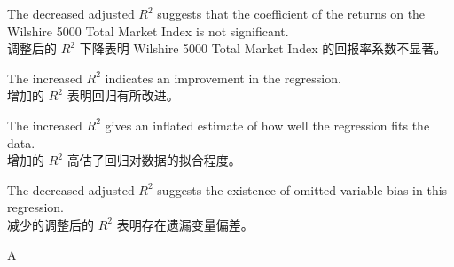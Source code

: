 \documentclass{article}
\begin{document}
    \begin{choices}
        \item The decreased adjusted \(R^{2}\) suggests that the coefficient of the returns on the Wilshire 5000 Total Market Index is not significant.\\
        调整后的 \(R^{2}\) 下降表明 Wilshire 5000 Total Market Index 的回报率系数不显著。
        \item The increased \(R^{2}\) indicates an improvement in the regression.\\
        增加的 \(R^{2}\) 表明回归有所改进。
        \item The increased \(R^{2}\) gives an inflated estimate of how well the regression fits the data.\\
        增加的 \(R^{2}\) 高估了回归对数据的拟合程度。
        \item The decreased adjusted \(R^{2}\) suggests the existence of omitted variable bias in this regression.\\
        减少的调整后的 \(R^{2}\) 表明存在遗漏变量偏差。
    \end{choices}
    
    \begin{correctanswer}
        A
    \end{correctanswer}
    
\end{document}
